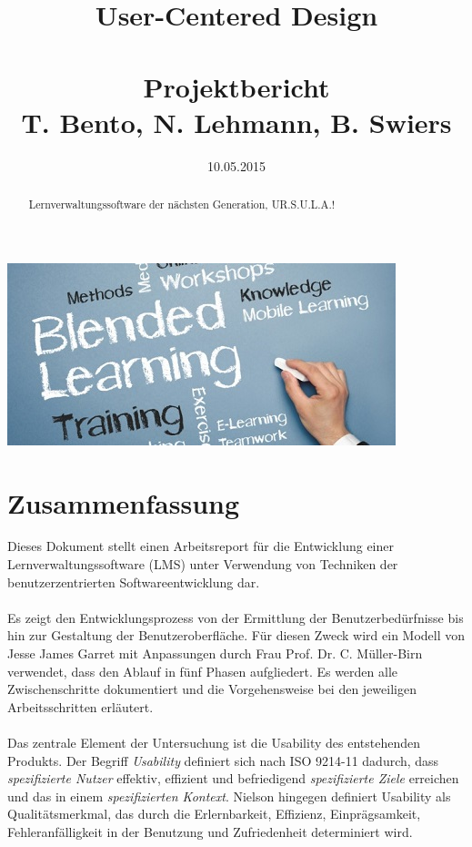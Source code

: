 \documentclass{article}
\title{User-Centered Design\\~\\Projektbericht\\ \small{T. Bento, N. Lehmann, B. Swiers}}
\date{10.05.2015}
\begin{document}
\renewcommand\abstractname{UR.S.U.L.A. (yoUR Study and Universial Learning Assistent)}
\maketitle
\includegraphics{img/title_pic.jpg}
\begin{abstract}
{\huge L}ernverwaltungssoftware der nächsten Generation, UR.S.U.L.A.!\\
\end{abstract}

\newpage

\tableofcontents

\newpage

\section{Zusammenfassung}

Dieses Dokument stellt einen Arbeitsreport für die Entwicklung einer Lernverwaltungssoftware (LMS) unter Verwendung von Techniken der benutzerzentrierten Softwareentwicklung dar.\\
\\
Es zeigt den Entwicklungsprozess von der Ermittlung der Benutzerbedürfnisse bis hin zur Gestaltung der Benutzeroberfläche. Für diesen Zweck wird ein Modell von Jesse James Garret mit Anpassungen durch Frau Prof. Dr. C. Müller-Birn verwendet, dass den Ablauf in fünf Phasen aufgliedert. Es werden alle Zwischenschritte dokumentiert und die Vorgehensweise bei den jeweiligen Arbeitsschritten erläutert.\\
\\
Das zentrale Element der Untersuchung ist die Usability des entstehenden Produkts. Der Begriff \textit{Usability} definiert sich nach ISO 9214-11 dadurch, dass \textit{spezifizierte Nutzer} effektiv, effizient und befriedigend \textit{spezifizierte Ziele} erreichen und das in einem \textit{spezifizierten Kontext}. Nielson hingegen definiert Usability als Qualitätsmerkmal, das durch die Erlernbarkeit, Effizienz, Einprägsamkeit, Fehleranfälligkeit in der Benutzung und Zufriedenheit determiniert wird.
\end{document}
